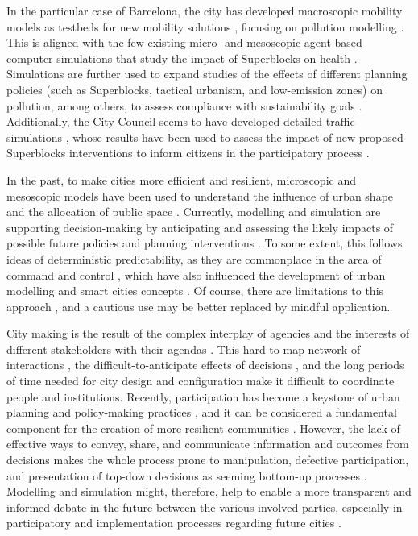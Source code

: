 In the particular case of Barcelona, the city has developed macroscopic mobility models as testbeds for new mobility solutions \citep{Montero2018}, focusing on pollution modelling \citep{Rodriguez-Rey2021}. This is aligned with the few existing micro- and mesoscopic agent-based computer simulations that study the impact of Superblocks on health \citep{Mueller2020}. Simulations are further used to expand studies of the effects of different planning policies (such as Superblocks, tactical urbanism, and low-emission zones) on pollution, among others, to assess compliance with sustainability goals \citep{Rodriguez-Rey2022}. Additionally, the City Council seems to have developed detailed traffic simulations \citep{Hourdos2008}, whose results have been used to assess the impact of new proposed Superblocks interventions to inform citizens in the participatory process \citep{AjuntamentdeBarcelona2019c,AjuntamentdeBarcelona2019b,AjuntamentdeBarcelona2013,AjuntamentdeBarcelona2018a,AjuntamentdeBarcelona2019a}. 

In the past, to make cities more efficient and resilient, microscopic and mesoscopic models have been used to understand the influence of urban shape and the allocation of public space \citep{Zhang2020,Muhlich2015,Ortigosa2019,Zhang2020cityblocksize}. Currently, modelling and simulation are supporting decision-making by anticipating and assessing the likely impacts of possible future policies and planning interventions \citep{AyuntamientodeMadrid2021,Batty2020,Iacono2008}. To some extent, this follows ideas of deterministic predictability, as they are commonplace in the area of command and control \citep{CardosoLlach2015}, which have also influenced the development of urban modelling \citep{Lowry1964,Forrester1969} and smart cities concepts \citep{Datta2019}. Of course, there are limitations to this approach \citep{Caldarelli2023}, and a cautious use may be better replaced by mindful application.

City making is the result of the complex interplay of agencies and the interests of different stakeholders with their agendas \citep{Zografos2020}. This hard-to-map network of interactions \citep{Caldarelli2023}, the difficult-to-anticipate effects of decisions \citep{Gershenson2016}, and the long periods of time needed for city design and configuration \citep{Batty2020smartcities} make it difficult to coordinate people and institutions. Recently, participation has become a keystone of urban planning and policy-making practices \citep{Ratti2015}, and it can be considered a fundamental component for the creation of more resilient communities \citep{Mahajan2022}. However, the lack of effective ways to convey, share, and communicate information and outcomes from decisions makes the whole process prone to manipulation, defective participation, and presentation of top-down decisions as seeming bottom-up processes \citep{Blundell-Jones2005,Boonstra2011}.  Modelling and simulation might, therefore, help to enable a more transparent and informed debate in the future between the various involved parties, especially in participatory and implementation processes regarding future cities \citep{Priebe2019}.

